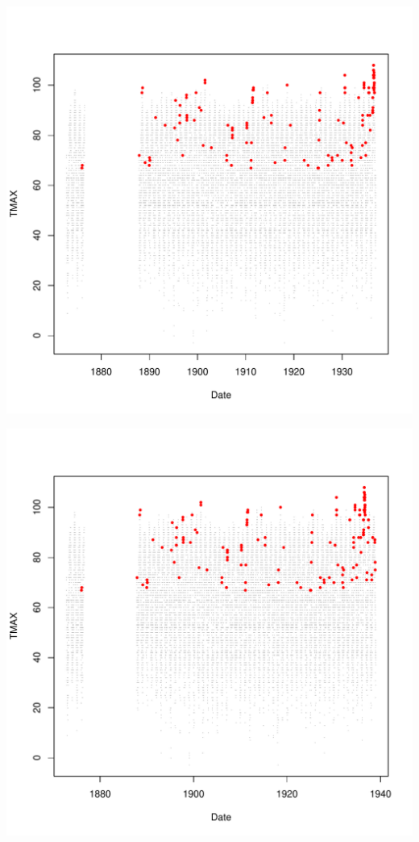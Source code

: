\documentclass{article}\usepackage[]{graphicx}\usepackage[]{color}
\makeatletter
\def\maxwidth{ %
  \ifdim\Gin@nat@width>\linewidth
    \linewidth
  \else
    \Gin@nat@width
  \fi
}
\newenvironment{knitrout}{}{} %
\makeatother
\begin{document}
\begin{knitrout}
\includegraphics[width=\maxwidth]{figure/unnamed-chunk-4-28} 

\includegraphics[width=\maxwidth]{figure/unnamed-chunk-4-29} 


\end{knitrout}
\end{document}
